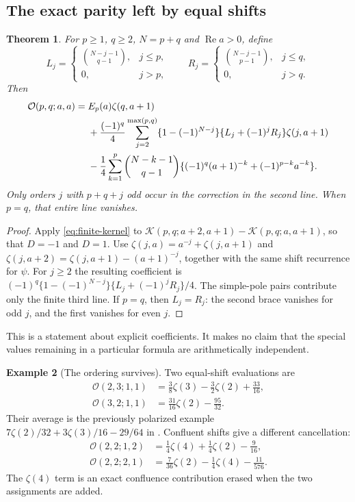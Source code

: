 \documentclass[11pt,a4paper]{article}
\numberwithin{equation}{section}
\newtheorem{theorem}{Theorem}[section]
\theoremstyle{definition}
\newtheorem{example}[theorem]{Example}
\theoremstyle{remark}
\newcommand{\Rea}{\operatorname{Re}}
\newcommand{\Ord}{\mathcal O}
\newcommand{\Kern}{\mathcal K}
\begin{document}
\subsection{The exact parity left by equal shifts}

\begin{theorem}\label{thm:parity}
For $p\ge1$, $q\ge2$, $N=p+q$ and $\Rea a>0$, define
\[
 L_j=\begin{cases}\binom{N-j-1}{q-1},&j\le p,\\0,&j>p,\end{cases}
 \qquad
 R_j=\begin{cases}\binom{N-j-1}{p-1},&j\le q,\\0,&j>q.\end{cases}
\]
Then
\begin{align}
 \Ord(p,q;a,a)={}&E_p(a)\zeta(q,a+1)\notag\\
 &+\frac{(-1)^q}{4}\sum_{j=2}^{\max(p,q)}
 \{1-(-1)^{N-j}\}\{L_j+(-1)^jR_j\}\zeta(j,a+1)\notag\\
 &-\frac14\sum_{k=1}^{p}\binom{N-k-1}{q-1}
 \{(-1)^q(a+1)^{-k}+(-1)^{p-k}a^{-k}\}.
 \label{eq:ordered-parity}
\end{align}
Only orders $j$ with $p+q+j$ odd occur in the correction in the second
line. When $p=q$, that entire line vanishes.
\end{theorem}

\begin{proof}
Apply \eqref{eq:finite-kernel} to
$\Kern(p,q;a+2,a+1)-\Kern(p,q;a,a+1)$, so that $D=-1$ and $D=1$.
Use $\zeta(j,a)=a^{-j}+\zeta(j,a+1)$ and
$\zeta(j,a+2)=\zeta(j,a+1)-(a+1)^{-j}$, together with the same
shift recurrence for $\psi$. For $j\ge2$ the resulting coefficient is
$(-1)^q\{1-(-1)^{N-j}\}\{L_j+(-1)^jR_j\}/4$.
The simple-pole pairs contribute only the finite third line.
If $p=q$, then $L_j=R_j$: the second brace vanishes for odd $j$,
and the first vanishes for even $j$.
\end{proof}

This is a statement about explicit coefficients. It makes no claim
that the special values remaining in a particular formula are
arithmetically independent.

\begin{example}[The ordering survives]\label{ex:ordered-values}
Two equal-shift evaluations are
\begin{align}
 \Ord(2,3;1,1)&=\frac38\zeta(3)-\frac32\zeta(2)+\frac{33}{16},
 \label{eq:example-23}\\
 \Ord(3,2;1,1)&=\frac{31}{16}\zeta(2)-\frac{95}{32}.
 \label{eq:example-32}
\end{align}
Their average is the previously polarized example
$7\zeta(2)/32+3\zeta(3)/16-29/64$ in \cite{repo:finite}.
Confluent shifts give a different cancellation:
\begin{align}
 \Ord(2,2;1,2)&=\frac14\zeta(4)+\frac14\zeta(2)-\frac9{16},
 \label{eq:example-1122}\\
 \Ord(2,2;2,1)&=\frac7{36}\zeta(2)-\frac14\zeta(4)-\frac{11}{576}.
 \label{eq:example-2211}
\end{align}
The $\zeta(4)$ term is an exact confluence contribution erased when
the two assignments are added.
\end{example}
\end{document}
